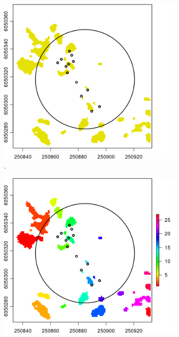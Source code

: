\documentclass{subfiles}
\begin{document}
\begin{figure} [h!]
\begin{subfigure}[t]{.49\textwidth}
  		\includegraphics[width=\textwidth]{img/dead/c9_sharpFilter}
  		\caption{.} 
  		\label{fig:c9_sharpFilter}
  	\end{subfigure} \hfill
  	\begin{subfigure}[t]{.49\textwidth}
  		\centering
  		\includegraphics[width=\textwidth]{img/dead/c10_segmentationResults}
  		\caption{} 
  		\label{fig:c10_segmentation}

\end{subfigure}
\end{figure}
\end{document}

